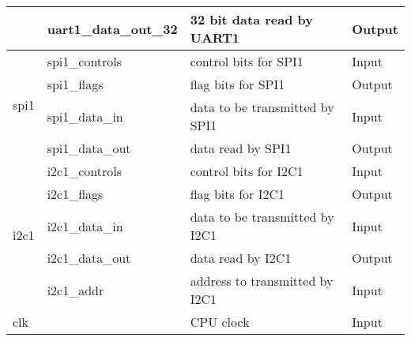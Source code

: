 \begin{table}[!h]
{\begin{tabular}{|ll|l|l|}
            \multicolumn{1}{|l|}{}                             & uart1\_data\_out\_32                       & 32 bit data read by UART1                          & Output                             \\ \hline
            \multicolumn{1}{|l|}{\multirow{4}{*}{spi1}}        & spi1\_controls                             & control bits for SPI1                              & Input                              \\ \cline{2-4}
            \multicolumn{1}{|l|}{}                             & spi1\_flags                                & flag bits for SPI1                                 & Output                             \\ \cline{2-4}
            \multicolumn{1}{|l|}{}                             & spi1\_data\_in                             & data to be transmitted by SPI1                     & Input                              \\ \cline{2-4}
            \multicolumn{1}{|l|}{}                             & spi1\_data\_out                            & data read by SPI1                                  & Output                             \\ \hline
            \multicolumn{1}{|l|}{\multirow{5}{*}{i2c1}}        & i2c1\_controls                             & control bits for I2C1                              & Input                              \\ \cline{2-4}
            \multicolumn{1}{|l|}{}                             & i2c1\_flags                                & flag bits for I2C1                                 & Output                             \\ \cline{2-4}
            \multicolumn{1}{|l|}{}                             & i2c1\_data\_in                             & data to be transmitted by I2C1                     & Input                              \\ \cline{2-4}
            \multicolumn{1}{|l|}{}                             & i2c1\_data\_out                            & data read by I2C1                                  & Output                             \\ \cline{2-4}
            \multicolumn{1}{|l|}{}                             & i2c1\_addr                                 & address to transmitted by I2C1                     & Input                              \\ \hline
            \multicolumn{2}{|l|}{clk}                          & CPU clock                                  & Input                                                                                   \\ \hline

\end{tabular}}
\end{table}
